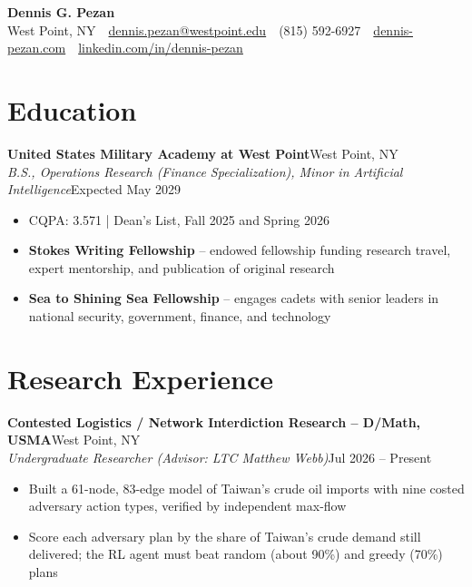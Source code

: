 \documentclass[10pt,letterpaper]{article}
\let\oldsection\section
\renewcommand{\section}{\needspace{3\baselineskip}\oldsection}
\newcommand{\entry}[4]{%
  \needspace{3\baselineskip}%
  \textbf{#1}\hfill #2\\
  \textit{#3}\hfill #4\par}
\begin{document}
\begin{center}
  {\LARGE\bfseries Dennis G. Pezan}\\[2pt]
  West Point, NY \,\textbullet\, \href{mailto:dennis.pezan@westpoint.edu}{dennis.pezan@westpoint.edu} \,\textbullet\, (815) 592-6927 \,\textbullet\, \href{https://dennis-pezan.com}{dennis-pezan.com} \,\textbullet\, \href{https://www.linkedin.com/in/dennis-pezan}{linkedin.com/in/dennis-pezan}
\end{center}
\vspace{-8pt}

\section{Education}
\entry{United States Military Academy at West Point}{West Point, NY}{B.S., Operations Research (Finance Specialization), Minor in Artificial Intelligence}{Expected May 2029}
\begin{itemize}
  \item CQPA: 3.571 \;|\; Dean's List, Fall 2025 and Spring 2026
  \item \textbf{Stokes Writing Fellowship} -- endowed fellowship funding research travel, expert mentorship, and publication of original research
  \item \textbf{Sea to Shining Sea Fellowship} -- engages cadets with senior leaders in national security, government, finance, and technology
\end{itemize}

\section{Research Experience}
\entry{Contested Logistics / Network Interdiction Research -- D/Math, USMA}{West Point, NY}{Undergraduate Researcher (Advisor: LTC Matthew Webb)}{Jul 2026 -- Present}
\begin{itemize}
  \item Built a 61-node, 83-edge model of Taiwan's crude oil imports with nine costed adversary action types, verified by independent max-flow
  \item Score each adversary plan by the share of Taiwan's crude demand still delivered; the RL agent must beat random (about 90\%) and greedy (70\%) plans
\end{itemize}
\end{document}
